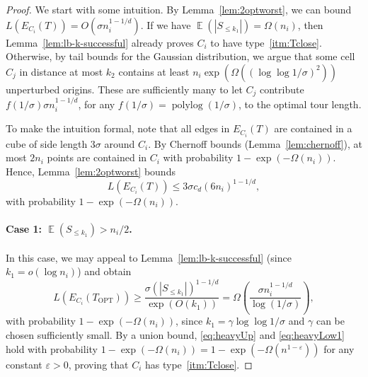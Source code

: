 \documentclass[11pt,DIV=12,a4paper]{scrartcl}
\DeclareMathOperator{\expected}{\mathbb{E}}
\DeclareMathOperator{\polylog}{polylog}
\newcommand{\itemref}[1]{\ref{itm:#1}}
\newcommand{\OPT}{\mathrm{OPT}}
\begin{document}
\begin{proof}
We start with some intuition. By Lemma~\ref{lem:2optworst}, we can bound $L(E_{C_i}(T)) = O(\sigma n_i^{1-1/d})$. If we have $\expected(|S_{\le k_1}|)=\Omega(n_i)$, then Lemma~\ref{lem:lb-k-successful} already proves $C_i$ to have type~\itemref{Tclose}. Otherwise, by tail bounds for the Gaussian distribution, we argue that some cell $C_j$ in distance at most $k_2$ contains at least $n_i \exp(\Omega((\log \log 1/\sigma)^2))$ unperturbed origins. These are sufficiently many to let $C_j$ contribute $f(1/\sigma)\sigma n_i^{1-1/d}$, for any $f(1/\sigma) = \polylog(1/\sigma)$, to the optimal tour length.

To make the intuition formal, note that all edges in $E_{C_i}(T)$ are contained in a cube of side length $3\sigma$ around $C_i$. By Chernoff bounds (Lemma~\ref{lem:chernoff}), at most $2n_i$ points are contained in $C_i$ with probability $1-\exp(-\Omega(n_i))$. Hence, Lemma~\ref{lem:2optworst} bounds 
\begin{equation}\label{eq:heavyUp}
L(E_{C_i}(T)) \le 3\sigma c_d (6n_i)^{1-1/d},
\end{equation}
with probability $1-\exp(-\Omega(n_i))$. 

\paragraph{Case 1: $\expected(S_{\le k_1}) > n_i/2$.} In this case, we may appeal to Lemma~\ref{lem:lb-k-successful} (since $k_1 = o(\log n_i)$) and obtain
\begin{equation}\label{eq:heavyLow1}
L(E_{C_i}(T_\OPT)) \ge  \frac{\sigma (|S_{\le k_1}|)^{1-1/d}}{\exp(O(k_1))} = \Omega\left( \frac{\sigma n_i^{1-1/d}}{\log(1/\sigma)}\right),
\end{equation}
with probability $1-\exp(-\Omega(n_i))$, since $k_1 = \gamma\log \log 1/\sigma$ and $\gamma$ can be chosen sufficiently small. By a union bound, \eqref{eq:heavyUp} and \eqref{eq:heavyLow1} hold with probability $1-\exp(-\Omega(n_i))=1-\exp(-\Omega(n^{1-\varepsilon}))$ for any constant $\varepsilon > 0$, proving that $C_i$ has type~\itemref{Tclose}.


\end{proof}
\end{document}
